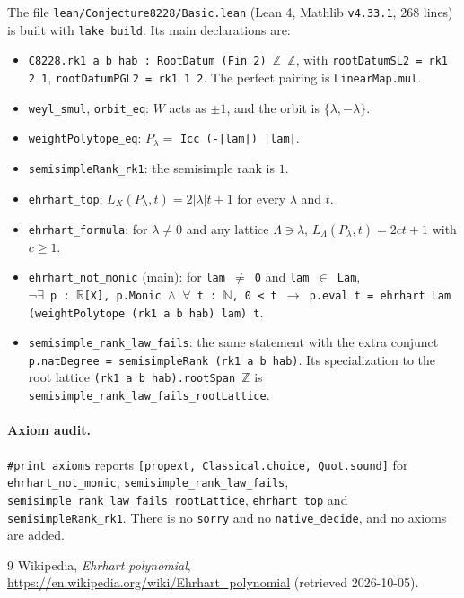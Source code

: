 \documentclass[11pt]{article}
\theoremstyle{remark}
\theoremstyle{definition}
\begin{document}
The file \texttt{lean/Conjecture8228/Basic.lean} (Lean 4, Mathlib \texttt{v4.33.1}, 268 lines) is built
with \texttt{lake build}. Its main declarations are:
\begin{itemize}
\item \texttt{C8228.rk1 a b hab : RootDatum (Fin 2) $\mathbb{Z}$ $\mathbb{Z}$}, with
\texttt{rootDatumSL2 = rk1 2 1}, \texttt{rootDatumPGL2 = rk1 1 2}. The perfect pairing is
\texttt{LinearMap.mul}.
\item \texttt{weyl\_smul}, \texttt{orbit\_eq}: $W$ acts as $\pm1$, and the orbit is $\{\lambda,-\lambda\}$.
\item \texttt{weightPolytope\_eq}: $P_\lambda = $ \texttt{Icc (-|lam|) |lam|}.
\item \texttt{semisimpleRank\_rk1}: the semisimple rank is $1$.
\item \texttt{ehrhart\_top}: $L_X(P_\lambda,t) = 2|\lambda|t+1$ for every $\lambda$ and $t$.
\item \texttt{ehrhart\_formula}: for $\lambda\ne0$ and any lattice $\Lambda\ni\lambda$,
$L_\Lambda(P_\lambda,t) = 2ct+1$ with $c\ge1$.
\item \texttt{ehrhart\_not\_monic} (main): for \texttt{lam $\ne$ 0} and \texttt{lam $\in$ Lam},\\
\texttt{$\neg\exists$ p : $\mathbb{R}$[X], p.Monic $\wedge$ $\forall$ t : $\mathbb{N}$, 0 < t $\to$ p.eval t = ehrhart Lam (weightPolytope (rk1 a b hab) lam) t}.
\item \texttt{semisimple\_rank\_law\_fails}: the same statement with the extra conjunct
\texttt{p.natDegree = semisimpleRank (rk1 a b hab)}. Its specialization to the root lattice
\texttt{(rk1 a b hab).rootSpan $\mathbb{Z}$} is \texttt{semisimple\_rank\_law\_fails\_rootLattice}.
\end{itemize}

\paragraph{Axiom audit.}
\texttt{\#print axioms} reports \texttt{[propext, Classical.choice, Quot.sound]} for
\texttt{ehrhart\_not\_monic}, \texttt{semisimple\_rank\_law\_fails},
\texttt{semisimple\_rank\_law\_fails\_rootLattice}, \texttt{ehrhart\_top} and
\texttt{semisimpleRank\_rk1}. There is no \texttt{sorry} and no \texttt{native\_decide}, and no axioms
are added.

\begin{thebibliography}{9}
 Wikipedia, \emph{Ehrhart polynomial},
\url{https://en.wikipedia.org/wiki/Ehrhart_polynomial} (retrieved 2026-10-05).
\end{thebibliography}
\end{document}
